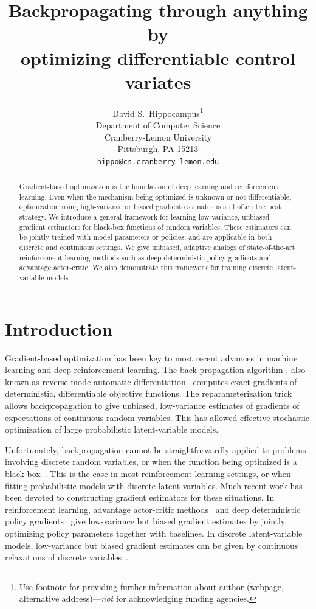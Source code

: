 \documentclass{article}
\title{Backpropagating through anything by\\ optimizing differentiable control variates}
\author{
  David S.~Hippocampus\thanks{Use footnote for providing further
    information about author (webpage, alternative
    address)---\emph{not} for acknowledging funding agencies.} \\
  Department of Computer Science\\
  Cranberry-Lemon University\\
  Pittsburgh, PA 15213 \\
  \texttt{hippo@cs.cranberry-lemon.edu} \\
}
\begin{document}
\maketitle
\begin{abstract}
Gradient-based optimization is the foundation of deep learning and reinforcement learning.
Even when the mechanism being optimized is unknown or not differentiable, optimization using high-variance or biased gradient estimates is still often the best strategy.
We introduce a general framework for learning low-variance, unbiased gradient estimators for black-box functions of random variables.
These estimators can be jointly trained with model parameters or policies, and are applicable in both discrete and continuous settings.
We give unbiased, adaptive analogs of state-of-the-art reinforcement learning methods such as deep deterministic policy gradients and advantage actor-critic.
We also demonstrate this framework for training discrete latent-variable models.
\end{abstract}


\section{Introduction}
Gradient-based optimization has been key to most recent advances in machine learning and deep reinforcement learning.
The back-propagation algorithm \citep{rumelhart1986learning}, also known as reverse-mode automatic differentiation~\citep{speelpenning1980compiling, rall1981automatic} computes exact gradients of deterministic, differentiable objective functions.
The reparameterization trick \citep{williams1992simple, kingma2013autoencoding, rezende2014stochastic} allows backpropagation to give unbiased, low-variance estimates of gradients of expectations of continuous random variables.
This has allowed effective stochastic optimization of large probabilistic latent-variable models.

Unfortunately, backpropagation cannot be straightforwardly applied to problems involving discrete random variables, or when the function being optimized is a black box~\citep{schulman2015gradient}.
This is the case in most reinforcement learning settings, or when fitting probabilistic models with discrete latent variables.
Much recent work has been devoted to constructing gradient estimators for these situations.
In reinforcement learning, advantage actor-critic methods~\citep{mnih2016asynchronous} and deep deterministic policy gradients~\citep{lillicrap2015continuous} give low-variance but biased gradient estimates by jointly optimizing policy parameters together with baselines.
In discrete latent-variable models, low-variance but biased gradient estimates can be given by continuous relaxations of discrete variables~\citep{maddison2016concrete, jang2016categorical}.
\end{document}
